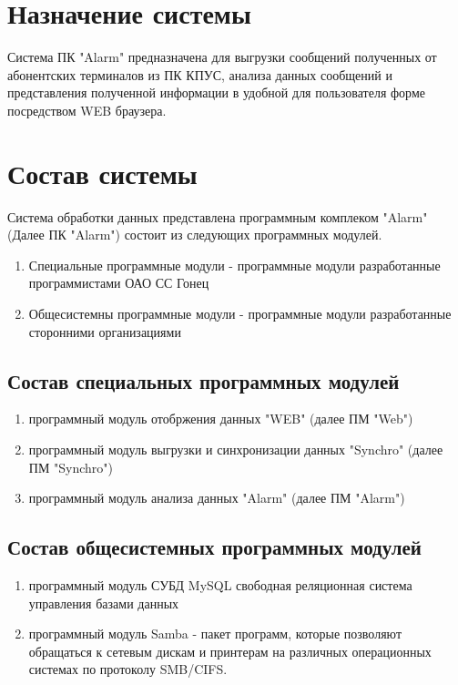 \documentclass[12pt]{article}[a4paper,14pt,russian]
\begin{document}
	\section {Назначение системы}
	Система ПК "Alarm" предназначена для выгрузки сообщений полученных от абонентских терминалов из ПК КПУС, анализа данных сообщений и представления полученной информации в удобной для пользователя форме посредством WEB браузера.
	
	\section{Состав системы}
	Система обработки данных представлена программным комплеком "Alarm" (Далее ПК "Alarm") состоит из следующих программных модулей.
	\begin{enumerate}
	\item  Специальные программные модули - программные модули разработанные программистами ОАО СС Гонец
	\item  Общесистемны программные модули  - программные модули разработанные сторонними организациями
	\end{enumerate}
    \subsection {Состав специальных программных модулей}
	\begin{enumerate}
	\item программный модуль отобржения данных "WEB" (далее ПМ "Web")
	\item программный модуль выгрузки и синхронизации данных "Synchro" (далее ПМ "Synchro")
	\item программный модуль анализа данных "Alarm" (далее ПМ "Alarm")
	\end{enumerate}
	\subsection {Состав общесистемных программных модулей}
    \begin{enumerate}
    \item программный модуль СУБД MySQL   свободная реляционная система управления базами данных
    \item программный модуль Samba - пакет программ, которые позволяют обращаться к сетевым дискам и принтерам на различных операционных системах по протоколу SMB/CIFS.
    
     \end{enumerate}
\end{document}
